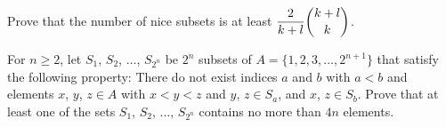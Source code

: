 Prove that the number of nice subsets is at least 
$ \dfrac{2}{k + l}\dbinom{k + l}{k}$.

\item[\textbf{C6.}]
For 
$ n\ge 2$, 
 let 
$ S_1$, 
$ S_2$, 
$ \ldots$, 
$ S_{2^n}$
 be 
$ 2^n$
 subsets of 
$ A = \{1, 2, 3, \ldots, 2^{n + 1}\}$
 that satisfy the following property: There do not exist indices 
$ a$
 and 
$ b$
 with 
$ a < b$
 and elements 
$ x$, 
$ y$, 
$ z\in A$
 with 
$ x < y < z$
 and 
$ y$, 
$ z\in S_a$, 
 and 
$ x$, 
$ z\in S_b$.
 Prove that at least one of the sets 
$ S_1$, 
$ S_2$, 
$ \ldots$, 
$ S_{2^n}$
 contains no more than 
$ 4n$
 elements.